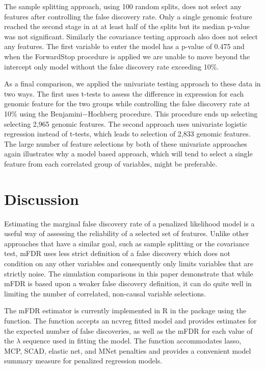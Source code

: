 The sample splitting approach, using 100 random splits, does not select any features after controlling the false discovery rate. Only a single genomic feature reached the second stage in at at least half of the splits but its median p-value was not significant. Similarly the covariance testing approach also does not select any features.  The first variable to enter the model has a p-value of 0.475 and when the ForwardStop procedure is applied we are unable to move beyond the intercept only model without the false discovery rate exceeding 10\%.

As a final comparison, we applied the univariate testing approach to these data in two ways. The first uses t-tests to assess the difference in expression for each genomic feature for the two groups while controlling the false discovery rate at 10\% using the Benjamini$-$Hochberg procedure.  This procedure ends up selecting selecting 2,965 genomic features. The second approach uses univariate logistic regression instead of t-tests, which leads to selection of 2,833 genomic features. The large number of feature selections by both of these univariate approaches again illustrates why a model based approach, which will tend to select a single feature from each correlated group of variables, might be preferable. 

\section{Discussion}
Estimating the marginal false discovery rate of a penalized likelihood model is a useful way of assessing the reliability of a selected set of features. Unlike other approaches that have a similar goal, such as sample splitting or the covariance test, mFDR uses less strict definition of a false discovery which does not condition on any other variables and consequently only limits variables that are strictly noise. The simulation comparisons in this paper demonstrate that while mFDR is based upon a weaker false discovery definition, it can do quite well in limiting the number of correlated, non-causal variable selections.

The mFDR estimator is currently implemented in R in the  package \citep{Breheny2011} using the  function. The function accepts an ncvreg fitted model  and provides estimates for the expected number of false discoveries, as well as the mFDR for each value of the $\lambda$ sequence used in fitting the model. The function accommodates lasso, MCP, SCAD, elastic net, and MNet \citep{Huang2016} penalties and provides a convenient model summary measure for penalized regression models.

